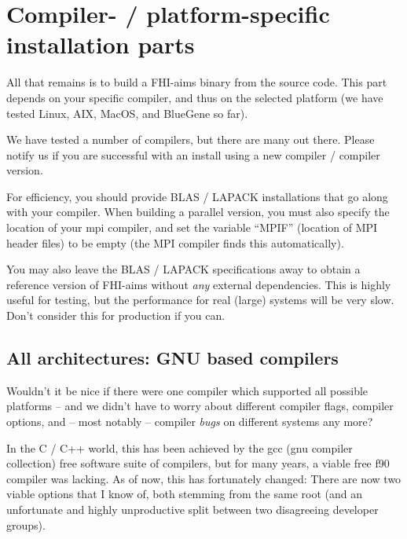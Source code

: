 \chapter{Compiler- / platform-specific installation parts}
\label{appendix_compilers}

All that remains is to build a FHI-aims binary from the
source code. This part depends on your specific compiler,
and thus on the selected platform (we have tested Linux, AIX,
MacOS, and BlueGene so far). 

We have tested a number of compilers, but there are many out there. Please
notify us if you are successful with an install using a new compiler /
compiler version.

For efficiency, you should provide BLAS / LAPACK installations that go along
with your compiler. When building a parallel version, you must also specify
the location of your mpi compiler, and set the variable ``MPIF'' (location of
MPI header files) to be empty (the MPI compiler finds this automatically).

You may also leave the BLAS / LAPACK specifications away to obtain a reference
version of FHI-aims without \emph{any} external dependencies. This is highly
useful for testing, but the performance for real (large) systems will be very
slow. Don't consider this for production if you can.

\section{All architectures: GNU based compilers}

Wouldn't it be nice if there were one compiler which supported all possible
platforms -- and we didn't have to worry about different compiler flags,
compiler options, and -- most notably -- compiler \emph{bugs} on different
systems any more?

In the C / C++ world, this has been achieved by the gcc (gnu compiler 
collection) free software suite of compilers, but for many years, a viable
free f90 compiler was lacking. As of now, this has fortunately
changed: There are now two viable options that I know of, both stemming from
the same root (and an unfortunate and highly unproductive split between two
disagreeing developer groups). 

